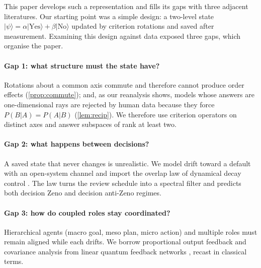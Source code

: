 \documentclass[11pt]{article}
\theoremstyle{definition}
\theoremstyle{remark}
\newcommand{\ket}[1]{\lvert #1\rangle}
\begin{document}
This paper develops such a representation and fills its gaps with three adjacent literatures. Our starting point was a simple design: a two-level state $\ket{\psi}=\alpha\ket{\mathrm{Yes}}+\beta\ket{\mathrm{No}}$ updated by criterion rotations and saved after measurement. Examining this design against data exposed three gaps, which organise the paper.

\paragraph{Gap 1: what structure must the state have?} Rotations about a common axis commute and therefore cannot produce order effects (\cref{prop:commute}); and, as our reanalysis shows, models whose answers are one-dimensional rays are rejected by human data because they force $P(B|A)=P(A|B)$ (\cref{lem:recip}). We therefore use criterion operators on distinct axes and answer subspaces of rank at least two.

\paragraph{Gap 2: what happens between decisions?} A saved state that never changes is unrealistic. We model drift toward a default with an open-system channel and import the overlap law of dynamical decay control \citep{kofman2000,kofman2001,kofman2005}. The law turns the review schedule into a spectral filter and predicts both decision Zeno and decision anti-Zeno regimes.

\paragraph{Gap 3: how do coupled roles stay coordinated?} Hierarchical agents (macro goal, meso plan, micro action) and multiple roles must remain aligned while each drifts. We borrow proportional output feedback and covariance analysis from linear quantum feedback networks \citep{yamamoto2008cdc,yamamoto2008pra}, recast in classical terms.
\end{document}
